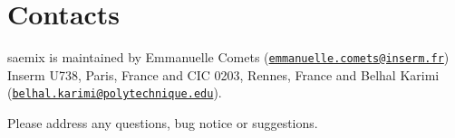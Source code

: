 \documentclass[]{book}
\begin{document}
\chapter*{Contacts}\label{contacts}

saemix is maintained by Emmanuelle Comets
(\href{mailto:emmanuelle.comets@inserm.fr}{\nolinkurl{emmanuelle.comets@inserm.fr}})
Inserm U738, Paris, France and CIC 0203, Rennes, France and Belhal
Karimi
(\href{mailto:belhal.karimi@polytechnique.edu}{\nolinkurl{belhal.karimi@polytechnique.edu}}).

Please address any questions, bug notice or suggestions.


\end{document}
